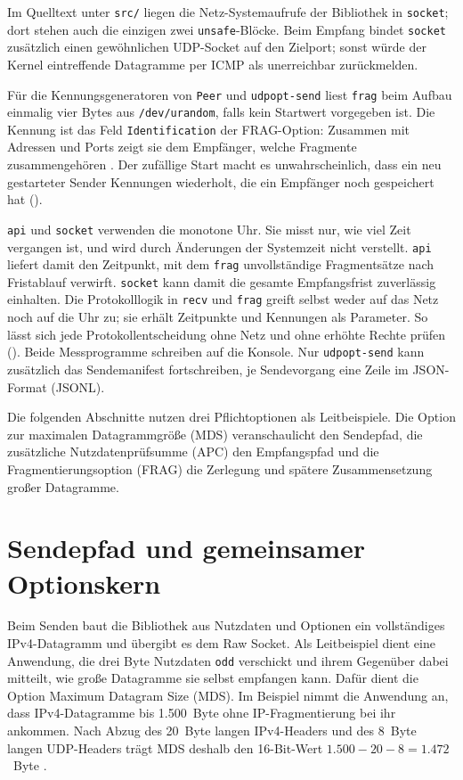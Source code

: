 Im Quelltext unter \texttt{src/} liegen die Netz-Systemaufrufe der Bibliothek in
\texttt{socket}; dort stehen auch die einzigen zwei \texttt{unsafe}-Blöcke. Beim Empfang bindet
\texttt{socket} zusätzlich einen gewöhnlichen UDP-Socket auf den Zielport; sonst würde der Kernel
eintreffende Datagramme per ICMP als unerreichbar zurückmelden.

Für die Kennungsgeneratoren von \texttt{Peer} und \texttt{udpopt-send} liest \texttt{frag} beim Aufbau
einmalig vier Bytes aus \texttt{/dev/urandom}, falls kein Startwert vorgegeben ist. Die Kennung ist das Feld
\texttt{Identification} der FRAG-Option: Zusammen mit Adressen und Ports zeigt sie dem Empfänger, welche
Fragmente zusammengehören \cite[Sec.~11.4]{rfc9868}. Der zufällige Start macht es unwahrscheinlich, dass
ein neu gestarteter Sender Kennungen wiederholt, die ein Empfänger noch gespeichert hat
().

\texttt{api} und \texttt{socket} verwenden die monotone Uhr. Sie misst nur, wie viel Zeit vergangen ist,
und wird durch Änderungen der Systemzeit nicht verstellt. \texttt{api} liefert damit den Zeitpunkt, mit dem
\texttt{frag} unvollständige Fragmentsätze nach Fristablauf verwirft. \texttt{socket} kann damit die
gesamte Empfangsfrist zuverlässig einhalten. Die Protokolllogik in \texttt{recv} und \texttt{frag} greift
selbst weder auf das Netz noch auf die Uhr zu; sie erhält Zeitpunkte und Kennungen als Parameter. So lässt
sich jede Protokollentscheidung ohne Netz und ohne erhöhte Rechte prüfen ().
Beide Messprogramme schreiben auf die Konsole. Nur \texttt{udpopt-send} kann zusätzlich das Sendemanifest
fortschreiben, je Sendevorgang eine Zeile im JSON-Format (JSONL).

Die folgenden Abschnitte nutzen drei Pflichtoptionen als Leitbeispiele. Die Option zur maximalen
Datagrammgröße (MDS) veranschaulicht den Sendepfad, die zusätzliche Nutzdatenprüfsumme (APC) den
Empfangspfad und die Fragmentierungsoption (FRAG) die Zerlegung und spätere Zusammensetzung großer
Datagramme.

\section{Sendepfad und gemeinsamer Optionskern}
\label{sec:sendepfad}

Beim Senden baut die Bibliothek aus Nutzdaten und Optionen ein vollständiges IPv4-Datagramm und übergibt
es dem Raw Socket. Als Leitbeispiel dient eine Anwendung, die drei Byte Nutzdaten \texttt{odd} verschickt
und ihrem Gegenüber dabei mitteilt, wie große Datagramme sie selbst empfangen kann. Dafür dient die Option
Maximum Datagram Size (MDS). Im Beispiel nimmt die Anwendung an, dass IPv4-Datagramme bis 1.500~Byte ohne
IP-Fragmentierung bei ihr ankommen. Nach Abzug des 20~Byte langen IPv4-Headers und des 8~Byte langen
UDP-Headers trägt MDS deshalb den 16-Bit-Wert $1.500 - 20 - 8 = 1.472$~Byte
\cite[Sec.~11.5]{rfc9868}.

